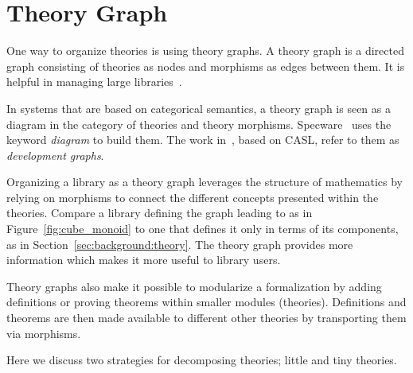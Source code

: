 
\section{Theory Graph}\label{sec:background:theorygraph}
One way to organize theories is using theory graphs. A theory graph is a directed graph consisting of theories as nodes and morphisms as edges between them. It is helpful in managing large libraries~\cite{kohlhase2010towards}.

In systems that are based on categorical semantics, a theory graph is seen as a diagram in the category of theories and theory morphisms. Specware~\cite{Smith99} uses the keyword \emph{diagram} to build them. The work in~\cite{developmentGraph2000}, based on CASL, refer to them as \emph{development graphs}. 

Organizing a library as a theory graph leverages the structure of mathematics by relying on morphisms to connect the different concepts presented within the theories. Compare a library defining the graph leading to   as in Figure~\ref{fig:cube_monoid} to one that defines it only in terms of its components, as in Section~\ref{sec:background:theory}. The theory graph provides more information which makes it more useful to library users. 

Theory graphs also make it possible to modularize a formalization by adding definitions or proving theorems within smaller modules (theories). Definitions and theorems are then made available to different other theories by transporting them via morphisms. 

Here we discuss two strategies for decomposing theories; little and tiny theories.  

  
